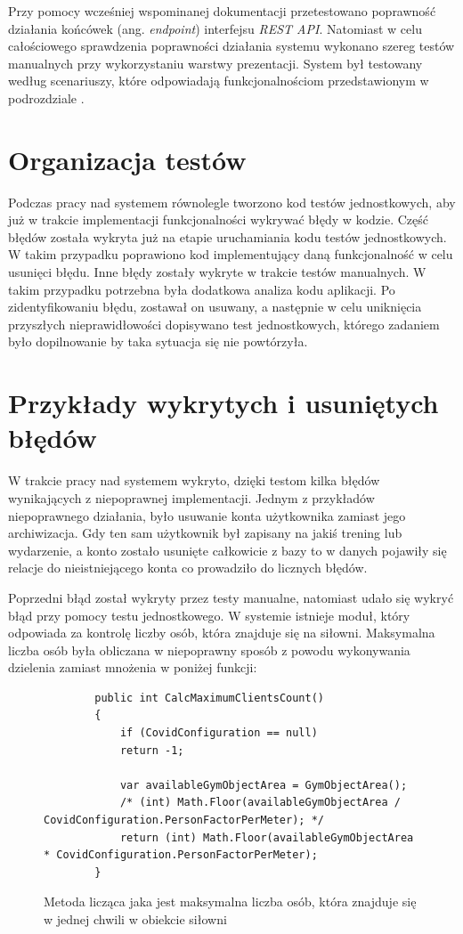 \documentclass[a4paper,twoside,12pt]{book}
\newcommand{\obcy}[1]{\emph{#1}}
\newcommand{\ang}[1]{{\selectlanguage{british}\obcy{#1}}}
\begin{document}
Przy pomocy wcześniej wspominanej dokumentacji przetestowano poprawność działania końcówek (ang. \ang{endpoint}) interfejsu \textit{REST API}. Natomiast w celu całościowego sprawdzenia poprawności działania systemu wykonano szereg testów manualnych przy wykorzystaniu warstwy prezentacji. System był testowany według scenariuszy, które odpowiadają funkcjonalnościom przedstawionym w podrozdziale \textbf{}.

\section{Organizacja testów}
Podczas pracy nad systemem równolegle tworzono kod testów jednostkowych, aby już w trakcie implementacji funkcjonalności wykrywać błędy w kodzie. Część błędów została wykryta już na etapie uruchamiania kodu testów jednostkowych. W takim przypadku poprawiono kod implementujący daną funkcjonalność w celu usunięci błędu. Inne błędy zostały wykryte w trakcie testów manualnych. W takim przypadku potrzebna była dodatkowa analiza kodu aplikacji. Po zidentyfikowaniu błędu, zostawał on usuwany, a następnie w celu uniknięcia przyszłych nieprawidłowości dopisywano test jednostkowych, którego zadaniem było dopilnowanie by taka sytuacja się nie powtórzyła.

\section{Przykłady wykrytych i usuniętych błędów}
W trakcie pracy nad systemem wykryto, dzięki testom kilka błędów wynikających z niepoprawnej implementacji. Jednym z przykładów niepoprawnego działania, było usuwanie konta użytkownika zamiast jego archiwizacja. Gdy ten sam użytkownik był zapisany na jakiś trening lub wydarzenie, a konto zostało usunięte całkowicie z bazy to w danych pojawiły się relacje do nieistniejącego konta co prowadziło do licznych błędów.

Poprzedni błąd został wykryty przez testy manualne, natomiast udało się wykryć błąd przy pomocy testu jednostkowego. W systemie istnieje moduł, który odpowiada za kontrolę liczby osób, która znajduje się na siłowni. Maksymalna liczba osób była obliczana w niepoprawny sposób z powodu wykonywania dzielenia zamiast mnożenia w poniżej funkcji:
\begin{figure} [H]
	\centering
	\begin{lstlisting}
        public int CalcMaximumClientsCount()
		{
			if (CovidConfiguration == null)
			return -1;
			
			var availableGymObjectArea = GymObjectArea();
			/* (int) Math.Floor(availableGymObjectArea / CovidConfiguration.PersonFactorPerMeter); */
			return (int) Math.Floor(availableGymObjectArea * CovidConfiguration.PersonFactorPerMeter);
		}
	\end{lstlisting}
	\caption{Metoda licząca jaka jest maksymalna liczba osób, która znajduje się w jednej chwili w obiekcie siłowni}
	\label{fig:calcMaxPeople}
\end{figure}
\end{document}

